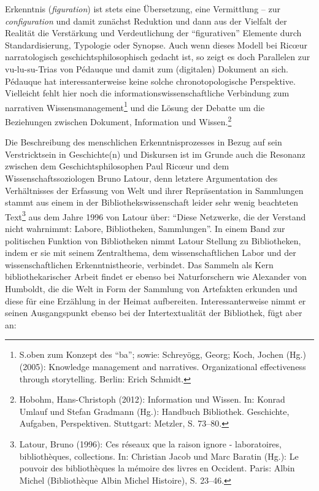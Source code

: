 Erkenntnis (\emph{figuration}) ist stets eine Übersetzung, eine
Vermittlung -- zur \emph{configuration} und damit zunächst Reduktion und
dann aus der Vielfalt der Realität die Verstärkung und Verdeutlichung
der \enquote{figurativen} Elemente durch Standardisierung, Typologie
oder Synopse. Auch wenn dieses Modell bei Ricœur narratologisch
geschichtsphilosophisch gedacht ist, so zeigt es doch Parallelen zur
vu-lu-su-Trias von Pédauque und damit zum (digitalen) Dokument an sich.
Pédauque hat interessanterweise keine solche chronotopologische
Perspektive. Vielleicht fehlt hier noch die
informationswissenschaftliche Verbindung zum narrativen
Wissensmanagement\footnote{S.oben zum Konzept des \enquote{ba}; sowie:
  Schreyögg, Georg; Koch, Jochen (Hg.) (2005): Knowledge management and
  narratives. Organizational effectiveness through storytelling. Berlin:
  Erich Schmidt.} und die Lösung der Debatte um die Beziehungen zwischen
Dokument, Information und Wissen.\footnote{Hobohm, Hans-Christoph
  (2012): Information und Wissen. In: Konrad Umlauf und Stefan Gradmann
  (Hg.): Handbuch Bibliothek. Geschichte, Aufgaben, Perspektiven.
  Stuttgart: Metzler, S. 73--80.}

Die Beschreibung des menschlichen Erkenntnisprozesses in Bezug auf sein
Verstricktsein in Geschichte(n) und Diskursen ist im Grunde auch die
Resonanz zwischen dem Geschichtsphilosophen Paul Ricœur und dem
Wissenschaftssoziologen Bruno Latour, denn letztere Argumentation des
Verhältnisses der Erfassung von Welt und ihrer Repräsentation in
Sammlungen stammt aus einem in der Bibliothekswissenschaft leider sehr
wenig beachteten Text\footnote{Latour, Bruno (1996): Ces réseaux que la
  raison ignore - laboratoires, bibliothèques, collections. In:
  Christian Jacob und Marc Baratin (Hg.): Le pouvoir des bibliothèques
  la mémoire des livres en Occident. Paris: Albin Michel (Bibliothèque
  Albin Michel Histoire), S. 23--46.} aus dem Jahre 1996 von Latour
über: \enquote{Diese Netzwerke, die der Verstand nicht wahrnimmt:
Labore, Bibliotheken, Sammlungen}. In einem Band zur politischen
Funktion von Bibliotheken nimmt Latour Stellung zu Bibliotheken, indem
er sie mit seinem Zentralthema, dem wissenschaftlichen Labor und der
wissenschaftlichen Erkenntnistheorie, verbindet. Das Sammeln als Kern
bibliothekarischer Arbeit findet er ebenso bei Naturforschern wie
Alexander von Humboldt, die die Welt in Form der Sammlung von Artefakten
erkunden und diese für eine Erzählung in der Heimat aufbereiten.
Interessanterweise nimmt er seinen Ausgangspunkt ebenso bei der
Intertextualität der Bibliothek, fügt aber an:

